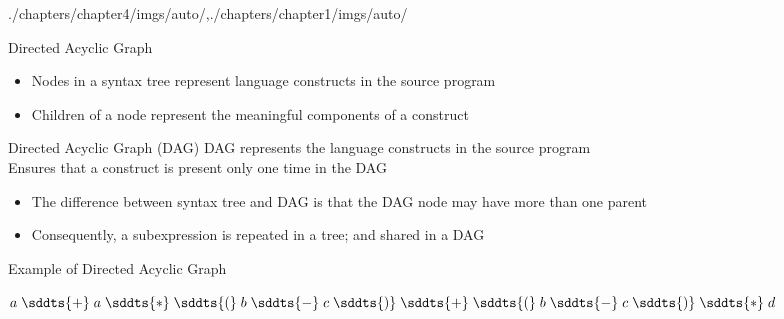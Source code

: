 \begin{graphicspathcontext}{{./chapters/chapter4/imgs/auto/},{./chapters/chapter1/imgs/auto/}}
\begin{bibunit}[apalike]
\begin{frame}{Directed Acyclic Graph}
	\begin{itemize}
	\item Nodes in a syntax tree represent language constructs in the source program
	\item Children of a node represent the meaningful components of a construct
	\end{itemize}
	\vspace{.25cm}
	\begin{definitionblock}{Directed Acyclic Graph (DAG)}
		DAG represents the language constructs in the source program \\
		Ensures that a construct is present only one time in the DAG
	\end{definitionblock}
	\vspace{.25cm}
	\begin{itemize}
	\item The difference between syntax tree and DAG is that the DAG node may have more than one parent
	\item Consequently, a subexpression is repeated in a tree; and shared in a DAG
	\end{itemize}
\end{frame}

\begin{frame}{Example of Directed Acyclic Graph}
	\begin{center}
		$a \; \sddts{+} \; a \; \sddts{*} \; \sddts{(} \; b \; \sddts{-} \; c \; \sddts{)} \; \sddts{+} \; \sddts{(} \; b \; \sddts{-} \; c \; \sddts{)} \; \sddts{*} \; d$
	\end{center}
	\vspace{2em}
	\centering
\end{frame}


\end{bibunit}
\end{graphicspathcontext}
